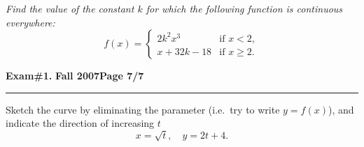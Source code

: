 \documentclass[12pt]{article}
\begin{document}
\bigskip
{\problem[10 pts] \em Find the value of the constant $k$ for which the following function is continuous everywhere:}
\begin{equation*}
f(x) = \begin{cases}
2k^2x^3 &\text{if }x<2, \\
x+32k-18 &\text{if }x \geq 2.
\end{cases}
\end{equation*}
\vspace{16cm}
\begin{flushright}
\end{flushright}
\newpage

\hfill{\large\bf Exam\#1.}\hfill{\large\bf
  Fall 2007}\hfill{\large\bf Page 7/7}\hrule

\bigskip
{\problem[10 pts] Sketch the curve by eliminating the parameter (i.e.~try to write $y=f(x)$), and indicate the direction of increasing $t$}
\begin{equation*}
x=\sqrt{t},\quad y=2t+4.
\end{equation*}
\begin{center}
\end{center}
\end{document}
